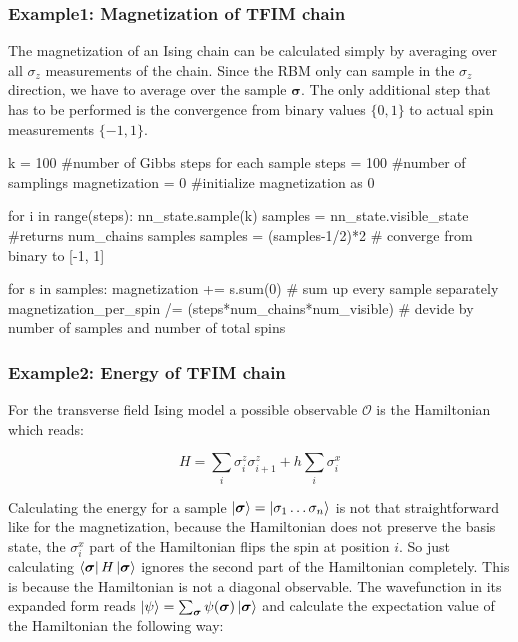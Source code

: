 \documentclass[submission, Phys]{SciPost}
\begin{document}
\subsubsection{Example1: Magnetization of TFIM chain}

The magnetization of an Ising chain can be calculated simply by averaging over all $\sigma_z$ measurements of the chain. Since the RBM only can sample in the $\sigma_z$ direction, we have to average over the sample $\bm{\sigma}$. The only additional step that has to be performed is the convergence from binary values $\{0,1  \}$ to actual spin measurements $\{-1 ,1  \}$.

\begin{python}
k = 100 #number of Gibbs steps for each sample
steps = 100 #number of samplings
magnetization = 0 #initialize magnetization as 0

for i in range(steps):
	nn_state.sample(k)
	samples = nn_state.visible_state #returns num_chains samples
	samples = (samples-1/2)*2 # converge from binary to [-1, 1]

	for s in samples: 
		magnetization += s.sum(0) # sum up every sample separately
magnetization_per_spin /= (steps*num_chains*num_visible) # devide by number of samples and number of total spins
\end{python}

\subsubsection{Example2: Energy of TFIM chain}

For the transverse field Ising model a possible observable $\mathcal{O}$ is the Hamiltonian which reads:

\begin{equation}
H = \sum_i \sigma^z_i \sigma^z_{i+1} + h \sum_i \sigma^x_{i}
\end{equation}

Calculating the energy for a sample $\ket{\bm{\sigma} }= \ket{\sigma_1 \dots  \sigma_n}$ is not that straightforward like for the magnetization, because the Hamiltonian does not preserve the basis state, the $\sigma^x_i$ part of the Hamiltonian flips the spin at position $i$. So just calculating $\bra{\bm{\sigma} } H \ket{\bm{\sigma} }$ ignores the second part of the Hamiltonian completely. This is because the Hamiltonian is not a diagonal observable. The wavefunction in its expanded form reads $\ket{\psi} = \sum_{\bm{\sigma}} \psi(\bm{\sigma}) \ket{\bm{\sigma}} $ and calculate the expectation value of the Hamiltonian the following way:
\end{document}
